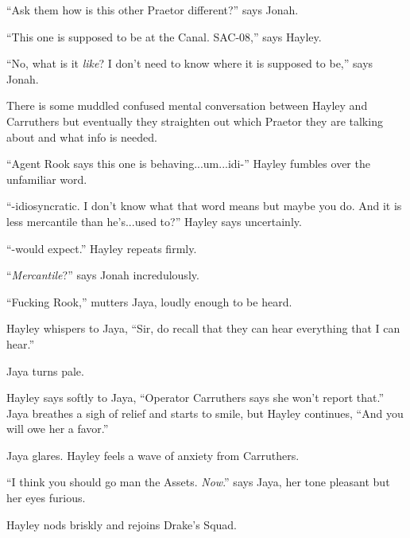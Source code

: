 ``Ask them how is this other Praetor different?'' says Jonah.


``This one is supposed to be at the Canal.  SAC-08,'' says Hayley.

``No, what is it \textit{like}?  I don't need to know where it is supposed to be,'' says Jonah.

There is some muddled confused mental conversation between Hayley and Carruthers but eventually they straighten out which Praetor they are talking about and what info is needed.


``Agent Rook says this one is behaving...um...idi-'' Hayley fumbles over the unfamiliar word.


``-idiosyncratic.  I don't know what that word means but maybe you do.  And it is less mercantile than he's...used to?'' Hayley says uncertainly.


``-would expect.'' Hayley repeats firmly.

``\textit{Mercantile}?'' says Jonah incredulously.

``Fucking Rook,'' mutters Jaya, loudly enough to be heard. 

Hayley whispers to Jaya, ``Sir, do recall that they can hear everything that I can hear.''

Jaya turns pale.


Hayley says softly to Jaya, ``Operator Carruthers says she won't report that.''  Jaya breathes a sigh of relief and starts to smile, but Hayley continues, ``And you will owe her a favor.''

Jaya glares.  Hayley feels a wave of anxiety from Carruthers.

``I think you should go man the Assets.  \textit{Now}.'' says Jaya, her tone pleasant but her eyes furious.

Hayley nods briskly and rejoins Drake's Squad.

